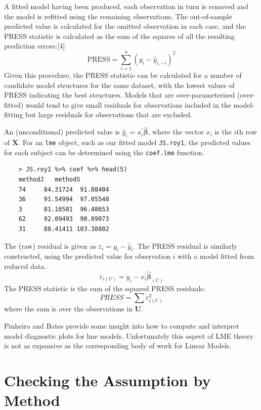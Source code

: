 A fitted model having been produced, each observation in turn is removed and the model is refitted using the remaining observations. The out-of-sample predicted value is calculated for the omitted observation in each case, and the PRESS statistic is calculated as the sum of the squares of all the resulting prediction errors:[4]
\[\mbox{PRESS} =\sum_{i=1}^n (y_i - \hat{y}_{i, -i})^2 \]
Given this procedure, the PRESS statistic can be calculated for a number of candidate model structures for the same dataset, with the lowest values of PRESS indicating the best structures. Models that are over-parameterised (over-fitted) would tend to give small residuals for observations included in the model-fitting but large residuals for observations that are excluded.

An (unconditional) predicted value is $\hat{y}_i = x^{\prime}_i \boldsymbol{\hat{\beta}}$, where 
the vector $x_i$ is the $i$th row of $\boldsymbol{X}$. For an \texttt{lme} object, such as our fitted model \texttt{JS.roy1}, the predicted values for each subject can be determined using the \texttt{coef.lme} function.
\begin{framed}
	\begin{verbatim}
	> JS.roy1 %>% coef %>% head(5)
	methodJ   methodS
	74     84.31724  91.08404
	36     91.54994  97.05548
	3      81.16581  96.48653
	62     92.09493  90.89073
	31     88.41411 103.38802
	\end{verbatim}
\end{framed}



The (raw) residual is given as $\varepsilon_i = y_i - \hat{y}_i$. The PRESS residual is
similarly constructed, using the predicted value for observation $i$ with a model fitted from reduced data.
\[ \varepsilon_{i(U)} = y_i - x^{\prime}_i \boldsymbol{\hat{\beta}}_{(U)} \]
The PRESS statistic is the sum of the squared PRESS residuals:
\[ PRESS = \sum \varepsilon^2_{i(U)} \]
where the sum is over the observations in $\boldsymbol{U}$.


\newpage

Pinheiro and Bates provide some insight into how to compute and interpret model diagnostic plots for lme models. Unfortunately this aspect of LME theory is not as expansive as the corresponding body of work for Linear Models.
\section{Checking the Assumption by Method}


